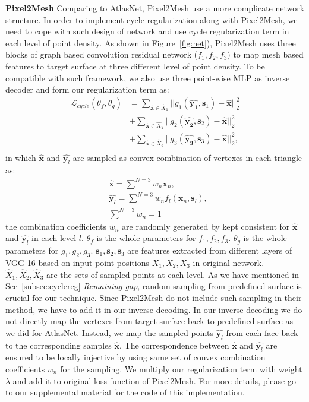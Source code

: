 \noindent\textbf{Pixel2Mesh}
Comparing to AtlasNet, Pixel2Mesh\cite{pixel2mesh} use a more complicate network structure. In order to implement cycle regularization along with Pixel2Mesh, we need to cope with such design of network and use cycle regularization term in each level of point density.
As shown in Figure~\ref{fig:net}), Pixel2Mesh uses three blocks of graph based convolution residual network ($f_1,f_2,f_3$) to map mesh based features to target surface at three different level of point density. To be compatible with such framework, we also use three point-wise MLP as inverse decoder and form our regularization term as:
\begin{equation}
\begin{aligned}
\mathcal{L}_{cycle}(\theta_f,\theta_g) 
&= \sum_{\hat{\mathbf{x}} \in \hat{X}_1}||g_{1}(\hat{\mathbf{y_1}},\mathbf{s}_1) - \hat{\mathbf{x}}||_2^2\\
&+ \sum_{\hat{\mathbf{x}} \in \hat{X}_2}||g_{2}(\hat{\mathbf{y_2}},\mathbf{s}_2) - \hat{\mathbf{x}}||_2^2\\
&+ \sum_{\hat{\mathbf{x}} \in \hat{X}_3}||g_{3}(\hat{\mathbf{y_3}},\mathbf{s}_3) - \hat{\mathbf{x}}||_2^2,\\
\end{aligned}
\end{equation}
in which $\hat{\mathbf{x}}$ and $\hat{\mathbf{y}_l}$ are sampled as convex combination of vertexes in each triangle as: 
\begin{equation}
\begin{aligned}
&\hat{\mathbf{x}} = \sum^{N=3} w_n\mathbf{x}_n, \\
&\hat{\mathbf{y}_l} = \sum^{N=3} w_nf_l(\mathbf{x}_n,\mathbf{s}_l),\\
&\sum^{N=3} w_n = 1
\end{aligned}
\end{equation}
the combination coefficients $w_n$ are randomly generated by kept consistent for $\hat{\mathbf{x}}$ and $\hat{\mathbf{y}_l}$ in each level $l$. $\theta_f$ is the whole parameters for $f_1,f_2,f_3$. $\theta_g$ is the whole parameters for $g_1,g_2,g_3$. $\mathbf{s}_1,\mathbf{s}_2,\mathbf{s}_3$ are features extracted from different layers of VGG-16 based on input point positions $X_1,X_2,X_3$ in original network. $\hat{X}_1,\hat{X}_2,\hat{X}_3$ are the sets of sampled points at each level. 
As we have mentioned in Sec~\ref{subsec:cyclereg} \emph{Remaining gap}, random sampling from predefined surface is crucial for our technique. Since Pixel2Mesh do not include such sampling in their method, we have to add it in our inverse decoding. In our inverse decoding we do not directly map the vertexes from target surface back to predefined surface as we did for AtlasNet. Instead, we map the sampled points $\hat{\mathbf{y}_l}$ from each face back to the corresponding samples $\hat{\mathbf{x}}$. The correspondence between $\hat{\mathbf{x}}$ and $\hat{\mathbf{y}_l}$ are ensured to be locally injective by using same set of convex combination coefficients $w_n$ for the sampling. We multiply our regularization term with weight $\lambda$ and add it to original loss function of Pixel2Mesh. For more details, please go to our supplemental material for the code of this implementation.